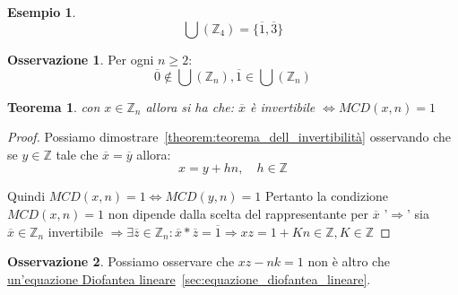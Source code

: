\documentclass{article}
\newtheorem{exmp}{Esempio}[section]
\newtheorem{theorem}{Teorema}[section]
\theoremstyle{definition}
\newtheorem{oss}{Osservazione}[section]
\begin{document}
\begin{exmp}
        \begin{equation*}
                \bigcup(\mathbb{Z}_4) = \{\overline{1}, \overline{3}\}
        \end{equation*} 
\end{exmp}


\begin{oss}
        Per ogni $n \ge 2$:
        \begin{equation*}
                \overline{0} \not \in \bigcup(\mathbb{Z}_n), \overline{1} \in \bigcup(\mathbb{Z}_n)
        \end{equation*}

\end{oss}

\begin{theorem}
        con $x \in \mathbb{Z}_n$ allora si ha che:\newline
        $ \overline{x} $ è invertibile $\Leftrightarrow MCD(x,n) = 1$
\end{theorem}

\begin{proof}
       Possiamo dimostrare~\ref{theorem:teorema_dell_invertibilità} osservando che se $y \in \mathbb{Z}$ tale che $\overline{x} = \overline{y}$ allora:
       \begin{equation*}
               x = y + hn, \quad h \in \mathbb{Z}
       \end{equation*}

       Quindi $MCD(x,n) = 1 \Leftrightarrow MCD(y,n) = 1$
       Pertanto la condizione $MCD(x,n) = 1$ non dipende dalla scelta del rappresentante per $\overline{x}$ \newline
       '$\Rightarrow$' sia $\overline{x} \in \mathbb{Z}_n$ invertibile $ \Rightarrow \exists \overline{z} \in \mathbb{Z}_n : \overline{x} * \overline{z} = \overline{1} \Rightarrow xz = 1 + Kn \in \mathbb{Z}, K \in \mathbb{Z}$
\end{proof}

\begin{oss}
       Possiamo osservare che $xz - nk = 1$ non è altro che \underline{un'equazione Diofantea lineare}~\ref{sec:equazione_diofantea_lineare}.
\end{oss}
\end{document}
